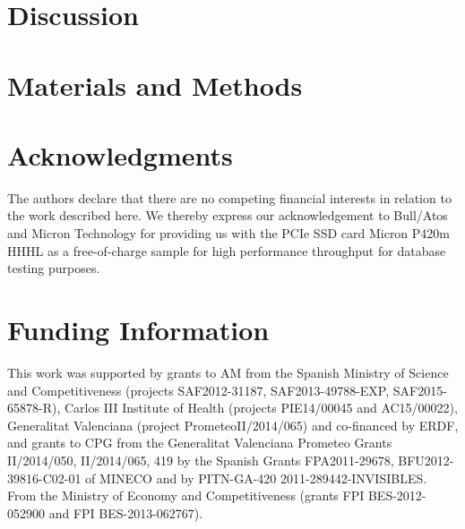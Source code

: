 \documentclass[12pt,oneside,letterpaper]{article}
\begin{document}
\section*{Discussion}

\section*{Materials and Methods}
   

\section*{Acknowledgments}
The authors declare that there are no competing financial interests in relation to the work described here. We thereby express our acknowledgement to Bull/Atos and Micron Technology for providing us with the PCIe SSD card Micron P420m HHHL as a free-of-charge sample for high performance throughput for database testing purposes.

\section*{Funding Information}
This work was supported by grants to AM from the Spanish Ministry of Science and Competitiveness (projects SAF2012-31187, SAF2013-49788-EXP, SAF2015-65878-R), Carlos III Institute of Health (projects PIE14/00045 and AC15/00022), Generalitat Valenciana (project PrometeoII/2014/065) and co-financed by ERDF, and grants to CPG from the Generalitat Valenciana Prometeo Grants II/2014/050, II/2014/065, 419 by the Spanish Grants FPA2011-29678, BFU2012-39816-C02-01 of MINECO and by PITN-GA-420 2011-289442-INVISIBLES. From the Ministry of Economy and Competitiveness (grants FPI BES-2012-052900 and FPI BES-2013-062767).
\end{document}
